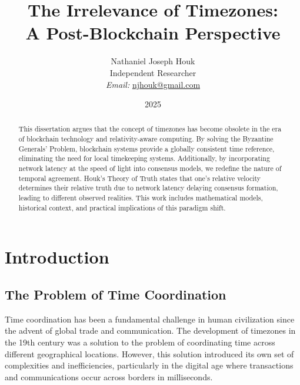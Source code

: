 \documentclass[12pt]{report}
\begin{document}
\title{The Irrelevance of Timezones: \\ A Post-Blockchain Perspective}

\author{Nathaniel Joseph Houk\\
Independent Researcher\\
\textit{Email:} \href{mailto:njhouk@gmail.com}{njhouk@gmail.com}}
\date{2025}

\maketitle

\begin{abstract}
This dissertation argues that the concept of timezones has become obsolete in the era of blockchain technology and relativity-aware computing. By solving the Byzantine Generals' Problem, blockchain systems provide a globally consistent time reference, eliminating the need for local timekeeping systems. Additionally, by incorporating network latency at the speed of light into consensus models, we redefine the nature of temporal agreement. Houk's Theory of Truth states that one's relative velocity determines their relative truth due to network latency delaying consensus formation, leading to different observed realities. This work includes mathematical models, historical context, and practical implications of this paradigm shift.
\end{abstract}

\chapter{Introduction}

\section{The Problem of Time Coordination}
Time coordination has been a fundamental challenge in human civilization since the advent of global trade and communication. The development of timezones in the 19th century was a solution to the problem of coordinating time across different geographical locations. However, this solution introduced its own set of complexities and inefficiencies, particularly in the digital age where transactions and communications occur across borders in milliseconds.
\end{document}

